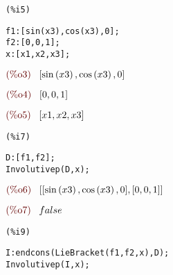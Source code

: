 \noindent
\begin{minipage}[t]{8ex}
\color{red}\bf
\begin{verbatim}
(%i5) 
\end{verbatim}
\end{minipage}
\begin{minipage}[t]{\textwidth}\color{blue}
\begin{verbatim}
f1:[sin(x3),cos(x3),0];
f2:[0,0,1];
x:[x1,x2,x3];
\end{verbatim}
\end{minipage}
\begin{math}\displaystyle
\parbox{8ex}{\color{labelcolor}(\%o3) }
[\mathrm{sin}\left( x3\right) ,\mathrm{cos}\left( x3\right) ,0]
\end{math}

\noindent
\begin{math}\displaystyle
\parbox{8ex}{\color{labelcolor}(\%o4) }
[0,0,1]
\end{math}

\noindent
\begin{math}\displaystyle
\parbox{8ex}{\color{labelcolor}(\%o5) }
[x1,x2,x3]
\end{math}

\noindent
\begin{minipage}[t]{8ex}
\color{red}\bf
\begin{verbatim}
(%i7) 
\end{verbatim}
\end{minipage}
\begin{minipage}[t]{\textwidth}
\color{blue}
\begin{verbatim}
D:[f1,f2];
Involutivep(D,x);
\end{verbatim}
\end{minipage}

\noindent
\begin{math}\displaystyle
\parbox{8ex}{\color{labelcolor}(\%o6) }
[[\mathrm{sin}\left( x3\right) ,\mathrm{cos}\left( x3\right) ,0],[0,0,1]]
\end{math}

\noindent
\begin{math}\displaystyle
\parbox{8ex}{\color{labelcolor}(\%o7) }
false
\end{math}


\noindent
\begin{minipage}[t]{8ex}
\color{red}\bf
\begin{verbatim}
(%i9) 
\end{verbatim}
\end{minipage}
\begin{minipage}[t]{\textwidth}
\color{blue}
\begin{verbatim}
I:endcons(LieBracket(f1,f2,x),D);
Involutivep(I,x);
\end{verbatim}
\end{minipage}

